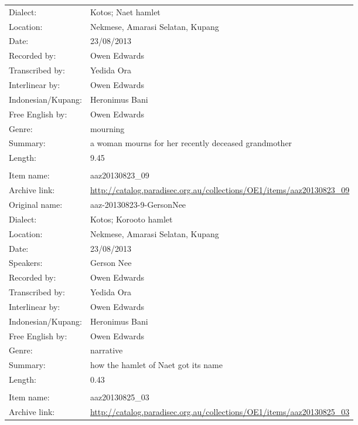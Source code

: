 \begin{longtable}{lL{.67\textwidth}}
Dialect:				& Kotos; Naet hamlet \\
Location:				& Nekmese{\Q}, Amarasi Selatan, Kupang \\
Date:				& 23/08/2013\\
Recorded by:			& Owen Edwards\\
Transcribed by:		& Yedida Ora\\
Interlinear by:		& Owen Edwards \\
Indonesian/Kupang:		& Heronimus Bani\\
Free English by:		& Owen Edwards\\
Genre:				& mourning\\
Summary:				& a woman mourns for her recently deceased grandmother\\
Length:				& 9.45\\ \lspbottomrule
			& \\
Item name:			& aaz20130823{\_}09\\
Archive link:			& \url{http://catalog.paradisec.org.au/collections/OE1/items/aaz20130823_09}\\
Original name:			& aaz-20130823-9-GersonNee\\
Dialect:				& Kotos; Koro{\Q}oto hamlet \\
Location:				& Nekmese{\Q}, Amarasi Selatan, Kupang \\
Date:				& 23/08/2013\\
Speakers:				& Gerson Nee\\
Recorded by:			& Owen Edwards\\
Transcribed by:		& Yedida Ora\\
Interlinear by:		& Owen Edwards \\
Indonesian/Kupang:		& Heronimus Bani\\
Free English by:		& Owen Edwards\\
Genre:				& narrative\\
Summary:				& how the hamlet of Naet got its name\\
Length:				& 0.43\\ \lspbottomrule
{}			& \\
Item name:			& aaz20130825{\_}03\\
Archive link:			& \url{http://catalog.paradisec.org.au/collections/OE1/items/aaz20130825_03}\\

\end{longtable}
